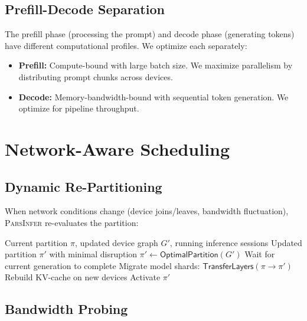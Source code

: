 \documentclass[11pt,a4paper]{article}
\newcommand{\parsdi}{\textsc{ParsInfer}\xspace}
\begin{document}
\subsection{Prefill-Decode Separation}

The prefill phase (processing the prompt) and decode phase (generating tokens) have different computational profiles. We optimize each separately:

\begin{itemize}
    \item \textbf{Prefill:} Compute-bound with large batch size. We maximize parallelism by distributing prompt chunks across devices.
    \item \textbf{Decode:} Memory-bandwidth-bound with sequential token generation. We optimize for pipeline throughput.
\end{itemize}

\section{Network-Aware Scheduling}

\subsection{Dynamic Re-Partitioning}

When network conditions change (device joins/leaves, bandwidth fluctuation), \parsdi re-evaluates the partition:

\begin{algorithm}[H]
\caption{Dynamic Re-Partitioning}
\label{alg:repartition}
\begin{algorithmic}[1]
\Require Current partition $\pi$, updated device graph $G'$, running inference sessions
\Ensure Updated partition $\pi'$ with minimal disruption
\State $\pi' \leftarrow \mathsf{OptimalPartition}(G')$ 
 
    \State Wait for current generation to complete
    \State Migrate model shards: $\mathsf{TransferLayers}(\pi \rightarrow \pi')$
    \State Rebuild KV-cache on new devices
    \State Activate $\pi'$
\EndIf
\end{algorithmic}
\end{algorithm}

\subsection{Bandwidth Probing}
\end{document}
